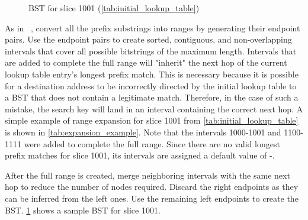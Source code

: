 \vspace{-\baselineskip}

\begin{figure}[h]
    \centering
    \caption{BST for slice 1001 (\cref{tab:initial_lookup_table})}
    \label{fig:tree_example}
\end{figure}

As in \dxr~\cite{dxr}, convert all the prefix substrings into ranges by generating their endpoint pairs. Use the endpoint pairs to create sorted, contiguous, and non-overlapping intervals that cover all possible bitstrings of the maximum length. Intervals that are added to complete the full range will "inherit" the next hop of the current lookup table entry's longest prefix match. This is necessary because it is possible for a destination address to be incorrectly directed by the initial lookup table to a BST that does not contain a legitimate match. Therefore, in the case of such a mistake, the search key will land in an interval containing the correct next hop. A simple example of range expansion for slice 1001 from \cref{tab:initial_lookup_table} is shown in \cref{tab:expansion_example}. Note that the intervals 1000-1001 and 1100-1111 were added to complete the full range. Since there are no valid longest prefix matches for slice 1001, its intervals are assigned a default value of -.

After the full range is created, merge neighboring intervals with the same next hop to reduce the number of nodes required. Discard the right endpoints as they can be inferred from the left ones. Use the remaining left endpoints to create the BST. \cref{fig:tree_example} shows a sample BST for slice 1001.

\vspace{-1em}

